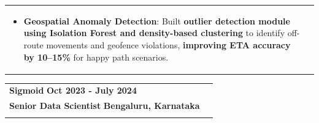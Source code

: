 \documentclass[a4paper,11pt]{article}
\begin{document}
\begin{tabularx}{\linewidth}{ @{}l r@{} }
\begin{minipage}[t]{\linewidth}
\begin{itemize}[nosep,after=\strut, leftmargin=1em, itemsep=4pt]
        \item \textbf{Geospatial Anomaly Detection}: Built \textbf{outlier detection module using Isolation Forest and density-based clustering} to identify off-route movements and geofence violations, \textbf{improving ETA accuracy by 10–15\%} for happy path scenarios.
    \end{itemize}
\end{minipage}
\end{tabularx}

\begin{tabularx}{\linewidth}{ @{}l r@{} }
\textbf{\Large{Sigmoid}} \hfill \textbf{Oct 2023 - July 2024} \\[4pt]
\textbf{\Large{Senior Data Scientist}} \hfill \textbf{Bengaluru, Karnataka} \\[4pt]
\begin{minipage}[t]{\linewidth}
    \begin{itemize}[nosep,after=\strut, leftmargin=1em, itemsep=4pt]

\end{itemize}
\end{minipage}
\end{tabularx}
\end{document}
